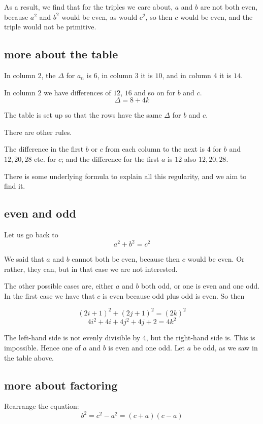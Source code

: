 \documentclass[11pt, oneside]{article}
\begin{document}
As a result, we find that for the triples we care about, $a$ and $b$ are not both even, because $a^2$ and $b^2$ would be even, as would $c^2$, so then $c$ would be even, and the triple would not be primitive.

\subsection*{more about the table}

In column 2, the $\Delta$ for $a_n$ is $6$, in column 3 it is $10$, and in column 4 it is $14$.

In column 2 we have differences of $12$, $16$ and so on for $b$ and $c$.
\[ \Delta = 8 + 4k \]

The table is set up so that the rows have the same $\Delta$ for $b$ and $c$.

There are other rules.

The difference in the first $b$ or $c$ from each column to the next is $4$ for $b$ and $12, 20, 28$ etc. for $c$; and the difference for the first $a$ is $12$ also $12,20,28$.

There is some underlying formula to explain all this regularity, and we aim to find it.

\subsection*{even and odd}

Let us go back to 
\[ a^2 + b^2 = c^2 \]

We said that $a$ and $b$ cannot both be even, because then $c$ would be even.  Or rather, they can, but in that case we are not interested.

The other possible cases are, either $a$ and $b$ both odd, or one is even and one odd.  In the first case we have that $c$ is even because odd plus odd is even.  So then

\[ (2i + 1)^2 + (2j + 1)^2 = (2k)^2 \]
\[ 4i^2 + 4i + 4j^2 + 4j + 2 = 4k^2 \]

The left-hand side is not evenly divisible by $4$, but the right-hand side is.  This is impossible.  Hence one of $a$ and $b$ is even and one odd.  Let $a$ be odd, as we saw in the table above.

\subsection*{more about factoring}

Rearrange the equation:
\[ b^2 = c^2 - a^2  = (c + a)(c - a) \]
\end{document}
